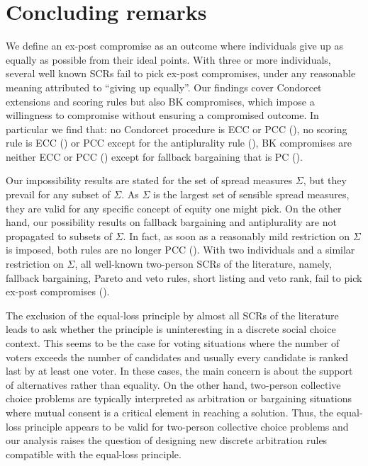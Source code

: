 \section{Concluding remarks}
\label{sec:conclusion}
We define an ex-post compromise as an outcome where individuals give up as equally as possible from their ideal points. 
With three or more individuals, several well known \acp{SCR} fail to pick ex-post compromises, under any reasonable meaning attributed to “giving up equally”. 
Our findings cover Condorcet extensions and scoring rules but also BK compromises, which impose a willingness to compromise without ensuring a compromised outcome.
In particular we find that: no Condorcet procedure is ECC or PCC (), no scoring rule is ECC () or PCC except for the antiplurality rule (), BK compromises are neither ECC or PCC () except for fallback bargaining that is PC ().

Our impossibility results are stated for the set of spread measures $\Sigma$, but they prevail for any subset of $\Sigma$. As $\Sigma$ is the largest set of sensible spread measures, they are valid for any specific concept of equity one might pick. On the other hand, our possibility results on fallback bargaining and antiplurality are not propagated to subsets of $\Sigma$. In fact, as soon as a reasonably mild restriction on $\Sigma$ is imposed, both rules are no longer PCC (). With two individuals and a similar restriction on $\Sigma$, all well-known two-person SCRs of the literature, namely, fallback bargaining, Pareto and veto rules, short listing and veto rank, fail to pick ex-post compromises ().

The exclusion of the equal-loss principle by almost all \acp{SCR} of the literature leads to ask whether the principle is uninteresting in a discrete social choice context. This seems to be the case for voting situations where the number of voters exceeds the number of candidates and usually every candidate is ranked last by at least one voter. In these cases, the main concern is about the support of alternatives rather than equality. On the other hand, two-person collective choice problems are typically interpreted as arbitration or bargaining situations where mutual consent is a critical element in reaching a solution. Thus, the equal-loss principle appears to be valid for two-person collective choice problems and our analysis raises the question of designing new discrete arbitration rules compatible with the equal-loss principle. 

